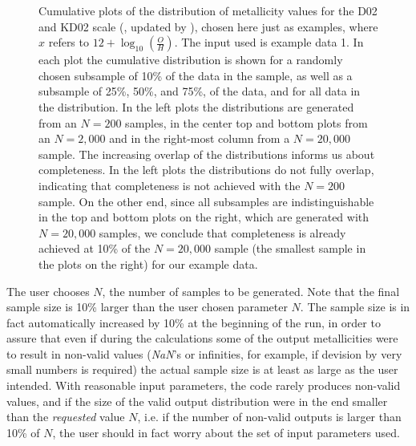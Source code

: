 \documentclass{emulateapj}
\newcommand{\oxab}{\ensuremath{12 + \log_{10}(\frac{O}{H})}}
\begin{document}
\begin{figure}[!ht]
\caption{Cumulative plots of the distribution of metallicity values for the D02 \citep{denicolo02} and KD02 scale (\citealt{kewley02}, updated by \citealt{kewley08}), chosen here just as examples, where $x$ refers to \oxab. The input used is example data 1. In each plot the cumulative distribution is shown for a randomly chosen subsample of 10\% of the data in the sample, as well as a subsample of 25\%, 50\%, and 75\%, of the data, and for all data in the distribution. In the left plots the distributions are generated from an $N=200$ samples, in the center top and bottom plots from an $N=2,000$  and in the right-most column from a $N=20,000$ sample. The increasing overlap of the distributions informs us about completeness. In the left plots the distributions do not fully overlap, indicating that completeness is not achieved with the $N=200$ sample. On the other end, since all subsamples are indistinguishable in the top and bottom plots on the right, which are generated with $N=20,000$ samples, we conclude that completeness is already achieved at 10\% of the $N=20,000$ sample (the smallest sample in the plots on the right) for our example data.}
 \label{cd}
\end{figure}

The user chooses $N$, the number of samples to be generated.  Note that the final sample size is 10\% larger than the user chosen parameter $N$. The sample size is in fact automatically increased by 10\% at the beginning of the run, in order to assure that even if during the calculations some of the output metallicities were to result in non-valid values (\emph{NaN}'s or infinities, for example, if devision by very small numbers is required) the actual sample size is at least as large as the user intended. With reasonable input parameters, the code rarely produces non-valid values, and if the size of the valid output distribution were in the end smaller than the \emph{requested} value $N$, i.e. if the number of non-valid outputs is larger than 10\% of $N$, the user should in fact worry about the set of input parameters used. 
\end{document}

